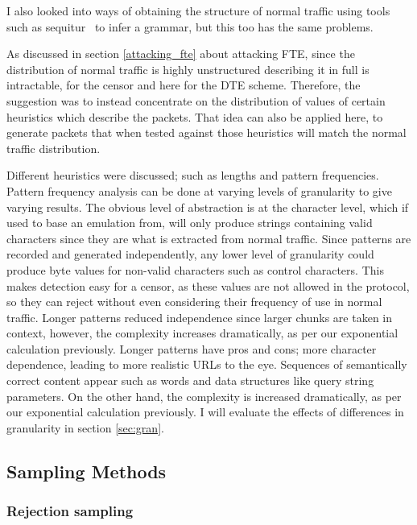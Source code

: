 \documentclass[ %
                    author={Samuel Russell},
                supervisor={Prof. Bogdan Warinschi},
                    degree={MEng},
                     title={Innocuous Ciphertexts},
                  subtitle={The DE-CENSOR Scheme},
                      type={research},
                      year={2018} ]{dissertation}
\begin{document}
I also looked into ways of obtaining the structure of normal traffic using tools such as sequitur~\cite{sequitur} to infer a grammar, but this too has the same problems.

As discussed in section \ref{attacking_fte} about attacking FTE, since the distribution of normal traffic is highly unstructured describing it in full is intractable, for the censor and here for the DTE scheme.
Therefore, the suggestion was to instead concentrate on the distribution of values of certain heuristics which describe the packets.
That idea can also be applied here, to generate packets that when tested against those heuristics will match the normal traffic distribution.

Different heuristics were discussed; such as lengths and pattern frequencies.
Pattern frequency analysis can be done at varying levels of granularity to give varying results.
The obvious level of abstraction is at the character level, which if used to base an emulation from, will only produce strings containing valid characters since they are what is extracted from normal traffic.
Since patterns are recorded and generated independently, any lower level of granularity could produce byte values for non-valid characters such as control characters.
This makes detection easy for a censor, as these values are not allowed in the protocol, so they can reject without even considering their frequency of use in normal traffic.
Longer patterns reduced independence since larger chunks are taken in context, however, the complexity increases dramatically, as per our exponential calculation previously.
Longer patterns have pros and cons; more character dependence, leading to more realistic URLs to the eye. Sequences of semantically correct content appear such as words and data structures like query string parameters. On the other hand, the complexity is increased dramatically, as per our exponential calculation previously.
I will evaluate the effects of differences in granularity in section \ref{sec:gran}.


\subsection{Sampling Methods}

\subsubsection{Rejection sampling}
\end{document}
